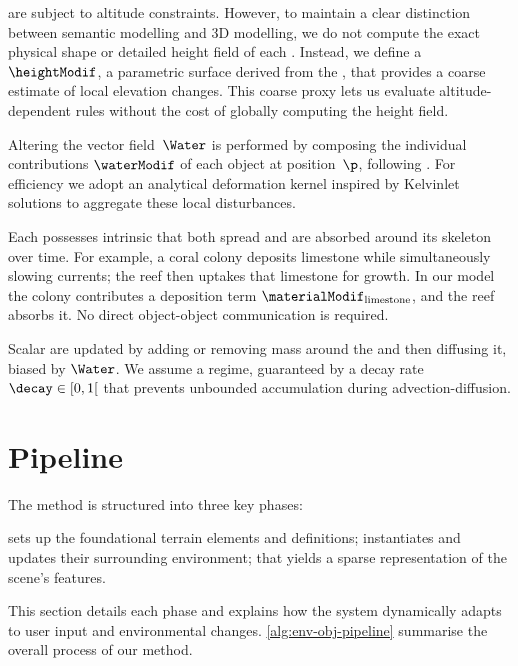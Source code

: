  are subject to altitude constraints.
However, to maintain a clear distinction between semantic modelling and 3D modelling, we do not compute the exact physical shape or detailed height field of each .
Instead, we define a ~$\heightModif$, a parametric surface derived from the , that provides a coarse estimate of local elevation changes. This coarse proxy lets us evaluate altitude-dependent rules without the cost of globally computing the height field.

Altering the vector field~$\Water$ is performed by composing the individual contributions $\waterModif$ of each object at position~$\p$, following \cite{Wejchert1991}. For efficiency we adopt an analytical deformation kernel inspired by Kelvinlet solutions \cite{DeGoes2017} to aggregate these local disturbances.

Each  possesses intrinsic  that both spread and are absorbed around its skeleton over time. For example, a coral colony deposits limestone while simultaneously slowing currents; the reef then uptakes that limestone for growth.
In our model the colony contributes a deposition term $\materialModif_{\text{limestone}}$, and the reef absorbs it. No direct object-object communication is required.

Scalar  are updated by adding or removing mass around the  and then diffusing it, biased by $\Water$.
We assume a  regime, guaranteed by a decay rate~$\decay \in [0, 1[$ that prevents unbounded accumulation during advection-diffusion.

\section{Pipeline}

The method is structured into three key phases: 
\begin{Itemize}
     sets up the foundational terrain elements and  definitions; 
     instantiates  and updates their surrounding environment; 
     that yields a sparse representation of the scene's features. 
\end{Itemize}
This section details each phase and explains how the system dynamically adapts to user input and environmental changes. \cref{alg:env-obj-pipeline} summarise the overall process of our method.

